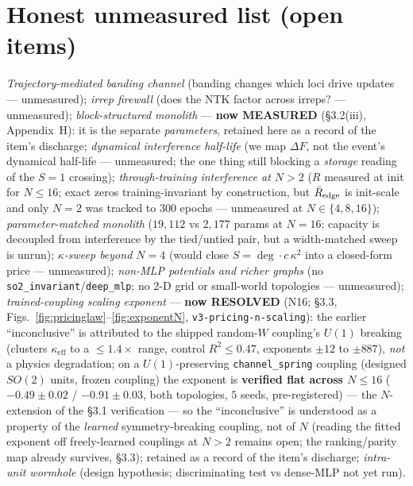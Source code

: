 \documentclass[11pt]{article}
\newcommand{\keff}{\kappa_{\mathrm{eff}}}
\begin{document}
\section{Honest unmeasured list (open items)}
\emph{Trajectory-mediated banding channel} (banding changes which loci drive updates --- unmeasured); \emph{irrep firewall} (does the NTK factor across irreps? --- unmeasured); \emph{block-structured monolith} --- \textbf{now MEASURED} (\S3.2(iii), Appendix~H): it is the separate \emph{parameters}, retained here as a record of the item's discharge; \emph{dynamical interference half-life} (we map $\Delta F$, not the event's dynamical half-life --- unmeasured; the one thing still blocking a \emph{storage} reading of the $S=1$ crossing); \emph{through-training interference at $N>2$} ($R$ measured at init for $N\le16$; exact zeros training-invariant by construction, but $\bar R_{\rm edge}$ is init-scale and only $N=2$ was tracked to 300 epochs --- unmeasured at $N\in\{4,8,16\}$); \emph{parameter-matched monolith} ($19{,}112$ vs $2{,}177$ params at $N=16$; capacity is decoupled from interference by the tied/untied pair, but a width-matched sweep is unrun); \emph{$\kappa$-sweep beyond $N=4$} (would close $S=\deg\cdot c\,\kappa^2$ into a closed-form price --- unmeasured); \emph{non-MLP potentials and richer graphs} (no \texttt{so2\_invariant}/\texttt{deep\_mlp}; no 2-D grid or small-world topologies --- unmeasured); \emph{trained-coupling scaling exponent} --- \textbf{now RESOLVED} (N16; \S3.3, Figs.~\ref{fig:pricinglaw}--\ref{fig:exponentN}, \texttt{v3-pricing-n-scaling}): the earlier ``inconclusive'' is attributed to the shipped random-$W$ coupling's $U(1)$ breaking (clusters $\keff$ to a $\le1.4\times$ range, control $R^2\le0.47$, exponents $\pm12$ to $\pm887$), \emph{not} a physics degradation; on a $U(1)$-preserving \texttt{channel\_spring} coupling (designed $SO(2)$ units, frozen coupling) the exponent is \textbf{verified flat across $N\le16$} ($-0.49\pm0.02$ / $-0.91\pm0.03$, both topologies, $5$ seeds, pre-registered) --- the $N$-extension of the \S3.1 verification --- so the ``inconclusive'' is understood as a property of the \emph{learned} symmetry-breaking coupling, not of $N$ (reading the fitted exponent off freely-learned couplings at $N>2$ remains open; the ranking/parity map already survives, \S3.3); retained as a record of the item's discharge; \emph{intra-unit wormhole} (design hypothesis; discriminating test vs dense-MLP not yet run).
\end{document}
